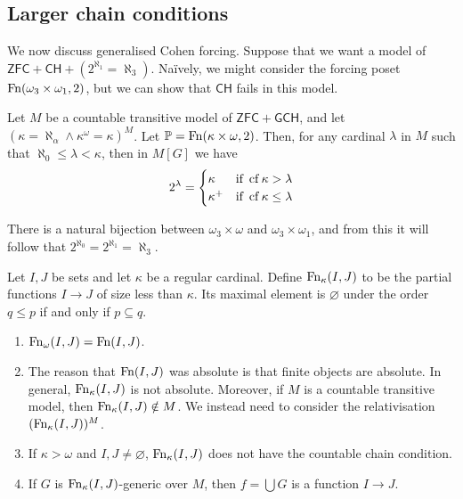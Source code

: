 \subsection{Larger chain conditions}
We now discuss generalised Cohen forcing.
Suppose that we want a model of \( \mathsf{ZFC} + \mathsf{CH} + (2^{\aleph_1} = \aleph_3) \).
Na\"ively, we might consider the forcing poset \( \operatorname{Fn}(\omega_3 \times \omega_1, 2) \), but we can show that \( \mathsf{CH} \) fails in this model.
\begin{proposition}
    Let \( M \) be a countable transitive model of \( \mathsf{ZFC} + \mathsf{GCH} \), and let \( (\kappa = \aleph_\alpha \wedge \kappa^\omega = \kappa)^M \).
    Let \( \mathbb P = \operatorname{Fn}(\kappa \times \omega, 2) \).
    Then, for any cardinal \( \lambda \) in \( M \) such that \( \aleph_0 \leq \lambda < \kappa \), then in \( M[G] \) we have
    \[ 2^\lambda = \begin{cases}
        \kappa & \text{if } \operatorname{cf} \kappa > \lambda \\
        \kappa^+ & \text{if } \operatorname{cf} \kappa \leq \lambda
    \end{cases} \]
\end{proposition}
There is a natural bijection between \( \omega_3 \times \omega \) and \( \omega_3 \times \omega_1 \), and from this it will follow that \( 2^{\aleph_0} = 2^{\aleph_1} = \aleph_3 \).
\begin{definition}
    Let \( I, J \) be sets and let \( \kappa \) be a regular cardinal.
    Define \( \operatorname{Fn}_\kappa(I, J) \) to be the partial functions \( I \to J \) of size less than \( \kappa \).
    Its maximal element is \( \varnothing \) under the order \( q \leq p \) if and only if \( p \subseteq q \).
\end{definition}
\begin{remark}
    \begin{enumerate}
        \item \( \operatorname{Fn}_\omega(I, J) = \operatorname{Fn}(I, J) \).
        \item The reason that \( \operatorname{Fn}(I, J) \) was absolute is that finite objects are absolute.
        In general, \( \operatorname{Fn}_\kappa(I, J) \) is not absolute.
        Moreover, if \( M \) is a countable transitive model, then \( \operatorname{Fn}_\kappa(I, J) \notin M \).
        We instead need to consider the relativisation \( (\operatorname{Fn}_\kappa(I, J))^M \).
        \item If \( \kappa > \omega \) and \( I, J \neq \varnothing \), \( \operatorname{Fn}_\kappa(I, J) \) does not have the countable chain condition.
        \item If \( G \) is \( \operatorname{Fn}_\kappa(I, J) \)-generic over \( M \), then \( f = \bigcup G \) is a function \( I \to J \).
    \end{enumerate}
\end{remark}
